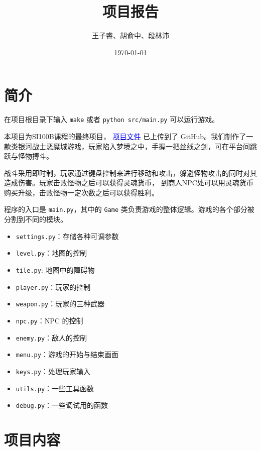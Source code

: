 \documentclass[12pt, twoside, a4paper]{article}
\newcommand{\inlinecode}[1]{\setlength{\fboxsep}{0.8mm} \colorbox{lightgray!40}{\texttt{#1}}}
\begin{document}
\title{项目报告}
\author{王子睿、胡俞中、段林沛}
\date{\today}
\maketitle

\tableofcontents

\section{简介}

在项目根目录下输入 \inlinecode{make} 或者 \inlinecode{python src/main.py} 可以运行游戏。

本项目为SI100B课程的最终项目，
\href{https://github.com/o06660o/Kono-Aozora-ni-Yakusoku-o}{\textcolor{blue}{项目文件}}
已上传到了 GitHub。我们制作了一款类银河战士恶魔城游戏，玩家陷入梦境之中，手握一把丝线之剑，可在平台间跳跃与怪物搏斗。

战斗采用即时制，玩家通过键盘控制来进行移动和攻击，躲避怪物攻击的同时对其造成伤害。玩家击败怪物之后可以获得灵魂货币，
到商人NPC处可以用灵魂货币购买升级，击败怪物一定次数之后可以获得胜利。

程序的入口是 \inlinecode{main.py}，其中的 \inlinecode{Game} 类负责游戏的整体逻辑。游戏的各个部分被分割到不同的模块。
\begin{itemize}
    \item \inlinecode{settings.py}：存储各种可调参数
    \item \inlinecode{level.py}：地图的控制
    \item \inlinecode{tile.py}: 地图中的障碍物
    \item \inlinecode{player.py}：玩家的控制
    \item \inlinecode{weapon.py}：玩家的三种武器
    \item \inlinecode{npc.py}：NPC 的控制
    \item \inlinecode{enemy.py}：敌人的控制
    \item \inlinecode{menu.py}：游戏的开始与结束画面
    \item \inlinecode{keys.py}：处理玩家输入
    \item \inlinecode{utils.py}：一些工具函数
    \item \inlinecode{debug.py}：一些调试用的函数
\end{itemize}


\section{项目内容}
\end{document}
